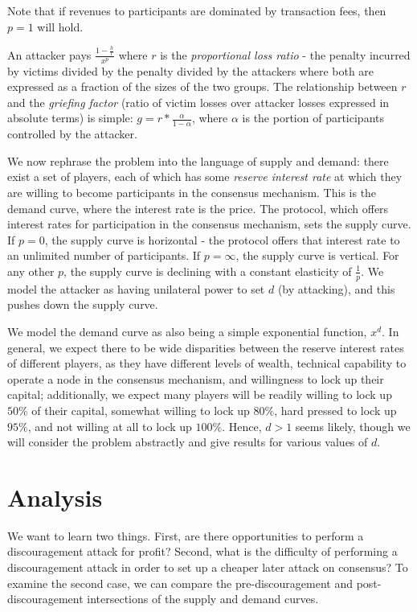 \documentclass[12pt]{article}
\begin{document}
Note that if revenues to participants are dominated by transaction fees, then $p=1$ will hold.

An attacker pays $\frac{1-\frac{h}{r}}{x^p}$ where $r$ is the \textit{proportional loss ratio} - the penalty incurred by victims divided by the penalty divided by the attackers where both are expressed as a fraction of the sizes of the two groups. The relationship between $r$ and the \textit{griefing factor} (ratio of victim losses over attacker losses expressed in absolute terms) is simple: $g = r * \frac{\alpha}{1-\alpha}$, where $\alpha$ is the portion of participants controlled by the attacker.

We now rephrase the problem into the language of supply and demand: there exist a set of players, each of which has some \textit{reserve interest rate} at which they are willing to become participants in the consensus mechanism. This is the demand curve, where the interest rate is the price. The protocol, which offers interest rates for participation in the consensus mechanism, sets the supply curve. If $p=0$, the supply curve is horizontal - the protocol offers that interest rate to an unlimited number of participants. If $p=\infty$, the supply curve is vertical. For any other $p$, the supply curve is declining with a constant elasticity of $\frac{1}{p}$. We model the attacker as having unilateral power to set $d$ (by attacking), and this pushes down the supply curve.

We model the demand curve as also being a simple exponential function, $x^d$. In general, we expect there to be wide disparities between the reserve interest rates of different players, as they have different levels of wealth, technical capability to operate a node in the consensus mechanism, and willingness to lock up their capital; additionally, we expect many players will be readily willing to lock up $50\%$ of their capital, somewhat willing to lock up $80\%$, hard pressed to lock up $95\%$, and not willing at all to lock up $100\%$. Hence, $d > 1$ seems likely, though we will consider the problem abstractly and give results for various values of $d$.

\section{Analysis}

We want to learn two things. First, are there opportunities to perform a discouragement attack for profit? Second, what is the difficulty of performing a discouragement attack in order to set up a cheaper later attack on consensus? To examine the second case, we can compare the pre-discouragement and post-discouragement intersections of the supply and demand curves.
\end{document}
